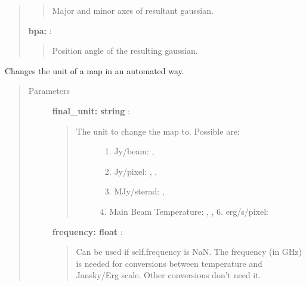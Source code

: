 \documentclass[a4paper,10pt,english]{sphinxmanual}
\begin{document}
\begin{fulllineitems}
\begin{fulllineitems}
\begin{quote}
\begin{description}
\begin{quote}
Major and minor axes of resultant gaussian.
\end{quote}

\textbf{bpa:} :
\begin{quote}

Position angle of the resulting gaussian.
\end{quote}

\end{description}\end{quote}

\end{fulllineitems}


\begin{fulllineitems}
\label{maps:astrolyze.maps.fits.FitsMap.change_unit}
Changes the unit of a map in an automated way.
\begin{quote}\begin{description}
\item[{Parameters }] \leavevmode
\textbf{final\_unit: string} :
\begin{quote}
\begin{description}
\item[{The unit to change the map to. Possible are:}] \leavevmode\begin{enumerate}
\item {} 
Jy/beam: , 

\item {} 
Jy/pixel: , , 

\item {} 
MJy/sterad: , 

\end{enumerate}

4. Main Beam Temperature: , , 
6. erg/s/pixel: 

\end{description}
\end{quote}

\textbf{frequency: float} :
\begin{quote}

Can be used if self.frequency is NaN. The frequency (in GHz) is
needed for conversions between temperature and Jansky/Erg scale.
Other conversions don't need it.
\end{quote}


\end{description}
\end{quote}
\end{fulllineitems}
\end{fulllineitems}
\end{document}
